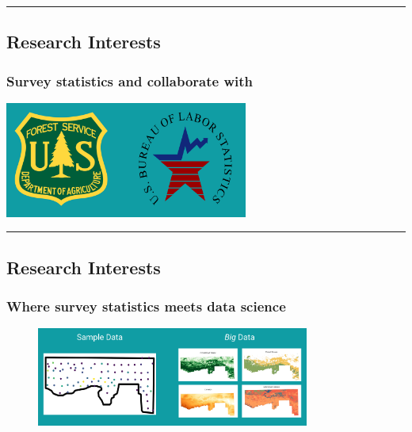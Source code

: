 \documentclass[
  letterpaper,
  DIV=11,
  numbers=noendperiod]{scrartcl}
\begin{document}
\begin{center}\rule{0.5\linewidth}{0.5pt}\end{center}

\hypertarget{research-interests}{%
\subsection{Research Interests}\label{research-interests}}

\hypertarget{survey-statistics-and-collaborate-with}{%
\subsubsection{Survey statistics and collaborate
with}\label{survey-statistics-and-collaborate-with}}

\includegraphics[width=0.6\textwidth,height=\textheight]{img/logos.jpeg}

\begin{center}\rule{0.5\linewidth}{0.5pt}\end{center}

\hypertarget{research-interests-1}{%
\subsection{Research Interests}\label{research-interests-1}}

\hypertarget{where-survey-statistics-meets-data-science}{%
\subsubsection{Where survey statistics meets data
science}\label{where-survey-statistics-meets-data-science}}

\begin{figure}

{\centering \includegraphics[width=3.53in,height=\textheight]{img/data.jpeg}

}

\end{figure}
\end{document}
